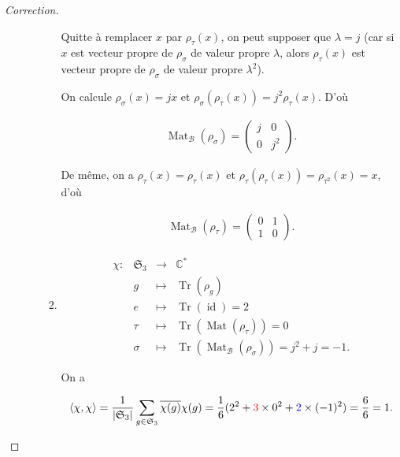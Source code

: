 \documentclass[french]{book}
\theoremstyle{definition}
\theoremstyle{remark}
\begin{document}
\begin{proof}[Correction]
\begin{enumerate}
\begin{enumerate}
\begin{enumerate}
        Quitte à remplacer \(x\) par \(\rho _{\tau}(x)\), on peut supposer que \(\lambda = j\) (car si \(x\) est vecteur propre de \(\rho _{\sigma}\) de valeur propre \(\lambda\), alors \(\rho _{\tau}(x)\) est vecteur propre de \(\rho _{\sigma}\) de valeur propre \(\lambda ^2\)).



        On calcule \(\rho _{\sigma}(x) = jx\) et \(\rho _{\sigma}(\rho _{\tau}(x)) = j ^2 \rho _{\tau}(x)\). D'où

        \begin{gather*}
          \operatorname{Mat}_{\mathcal{B}}(\rho _{\sigma}) = \begin{pmatrix}
          j & 0 \\
          0 & j ^2
          \end{pmatrix}.
        \end{gather*}

        De même, on a \(\rho _{\tau}(x) = \rho _{\tau}(x)\) et \(\rho _{\tau}(\rho _{\tau}(x)) = \rho _{\tau ^2}(x) = x\), d'où

        \begin{gather*}
          \operatorname{Mat} _{\mathcal{B}}(\rho _{\tau}) = \begin{pmatrix}
          0 & 1 \\
          1 & 0
          \end{pmatrix}.
        \end{gather*}
        \item \[\begin{matrix}
        \chi : & \mathfrak{S}_{3} & \longrightarrow & \mathbb{C}^{*} \\
        \ & g & \longmapsto & \operatorname{Tr}(\rho _{g})\\
        \ & e & \longmapsto & \operatorname{Tr}(\operatorname{id}) = 2 \\
        \ & \tau & \longmapsto & \operatorname{Tr}(\operatorname{Mat}(\rho _{\tau})) = 0 \\
        \ & \sigma & \longmapsto & \operatorname{Tr}(\operatorname{Mat} _{\mathcal{B}}(\rho _{\sigma})) = j ^2 + j = -1.
      \end{matrix}\]

        On a

        \begin{gather*}
          \langle \chi, \chi \rangle = \frac{1}{\left\lvert \mathfrak{S}_{3} \right\rvert} \sum_{g \in \mathfrak{S}_{3}} \overline{\chi(g)} \chi(g) = \frac{1}{6}(2 ^2 + \textcolor{red}{3} \times 0 ^2 + \textcolor{blue}{2} \times(-1) ^2)  = \frac{6}{6} = 1.
        \end{gather*}


\end{enumerate}
\end{enumerate}
\end{enumerate}
\end{proof}
\end{document}
